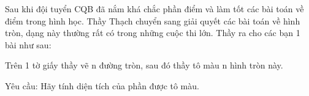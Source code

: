 Sau khi đội tuyển CQB đã nắm khá chắc phần điểm và làm tốt các bài toán về điểm trong hình học. Thầy Thạch chuyển sang giải quyết các bài toán về hình tròn, dạng này thường rất có trong những cuộc thi lớn. Thầy ra cho các bạn 1 bài như sau:  

   Trên 1 tờ giấy thầy vẽ n đường tròn, sau đó thầy tô màu n hình tròn này.  

   Yêu cầu: Hãy tính diện tích của phần được tô màu.